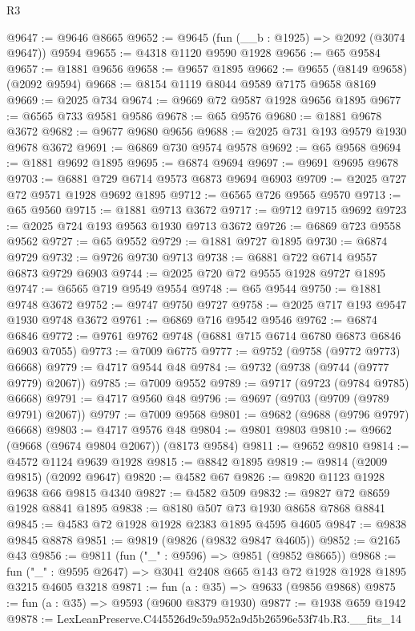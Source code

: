 \begin{lexlean}{R3}
\begin{coremodule}
@9647 := @9646 @8665
@9652 := @9645 (fun (__b : @1925) => @2092 (@3074 @9647)) @9594
@9655 := @4318 @1120 @9590 @1928
@9656 := @65 @9584
@9657 := @1881 @9656
@9658 := @9657 @1895
@9662 := @9655 (@8149 @9658) (@2092 @9594)
@9668 := @8154 @1119 @8044 @9589 @7175 @9658 @8169
@9669 := @2025 @734
@9674 := @9669 @72 @9587 @1928 @9656 @1895
@9677 := @6565 @733 @9581 @9586
@9678 := @65 @9576
@9680 := @1881 @9678 @3672
@9682 := @9677 @9680 @9656
@9688 := @2025 @731 @193 @9579 @1930 @9678 @3672
@9691 := @6869 @730 @9574 @9578
@9692 := @65 @9568
@9694 := @1881 @9692 @1895
@9695 := @6874 @9694
@9697 := @9691 @9695 @9678
@9703 := @6881 @729 @6714 @9573 @6873 @9694 @6903
@9709 := @2025 @727 @72 @9571 @1928 @9692 @1895
@9712 := @6565 @726 @9565 @9570
@9713 := @65 @9560
@9715 := @1881 @9713 @3672
@9717 := @9712 @9715 @9692
@9723 := @2025 @724 @193 @9563 @1930 @9713 @3672
@9726 := @6869 @723 @9558 @9562
@9727 := @65 @9552
@9729 := @1881 @9727 @1895
@9730 := @6874 @9729
@9732 := @9726 @9730 @9713
@9738 := @6881 @722 @6714 @9557 @6873 @9729 @6903
@9744 := @2025 @720 @72 @9555 @1928 @9727 @1895
@9747 := @6565 @719 @9549 @9554
@9748 := @65 @9544
@9750 := @1881 @9748 @3672
@9752 := @9747 @9750 @9727
@9758 := @2025 @717 @193 @9547 @1930 @9748 @3672
@9761 := @6869 @716 @9542 @9546
@9762 := @6874 @6846
@9772 := @9761 @9762 @9748 (@6881 @715 @6714 @6780 @6873 @6846 @6903 @7055)
@9773 := @7009 @6775
@9777 := @9752 (@9758 (@9772 @9773) @6668)
@9779 := @4717 @9544 @48
@9784 := @9732 (@9738 (@9744 (@9777 @9779) @2067))
@9785 := @7009 @9552
@9789 := @9717 (@9723 (@9784 @9785) @6668)
@9791 := @4717 @9560 @48
@9796 := @9697 (@9703 (@9709 (@9789 @9791) @2067))
@9797 := @7009 @9568
@9801 := @9682 (@9688 (@9796 @9797) @6668)
@9803 := @4717 @9576 @48
@9804 := @9801 @9803
@9810 := @9662 (@9668 (@9674 @9804 @2067)) (@8173 @9584)
@9811 := @9652 @9810
@9814 := @4572 @1124 @9639 @1928
@9815 := @8842 @1895
@9819 := @9814 (@2009 @9815) (@2092 @9647)
@9820 := @4582 @67
@9826 := @9820 @1123 @1928 @9638 @66 @9815 @4340
@9827 := @4582 @509
@9832 := @9827 @72 @8659 @1928 @8841 @1895
@9838 := @8180 @507 @73 @1930 @8658 @7868 @8841
@9845 := @4583 @72 @1928 @1928 @2383 @1895 @4595 @4605
@9847 := @9838 @9845 @8878
@9851 := @9819 (@9826 (@9832 @9847 @4605))
@9852 := @2165 @43
@9856 := @9811 (fun ("_" : @9596) => @9851 (@9852 @8665))
@9868 := fun ("_" : @9595 @2647) => @3041 @2408 @665 @143 @72 @1928 @1928 @1895 @3215 @4605 @3218
@9871 := fun (a : @35) => @9633 (@9856 @9868)
@9875 := fun (a : @35) => @9593 (@9600 @8379 @1930)
@9877 := @1938 @659 @1942
@9878 := LexLeanPreserve.C445526d9c59a952a9d5b26596e53f74b.R3.__fits_14

\end{coremodule}
\end{lexlean}
